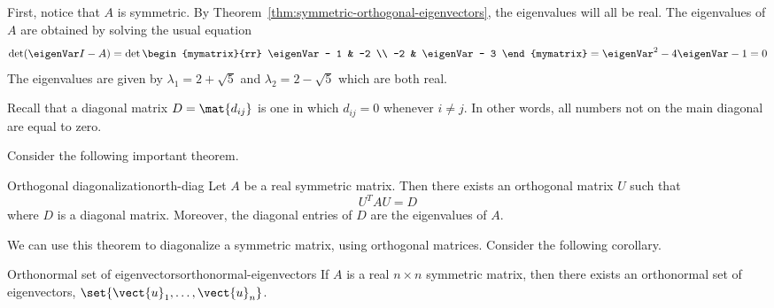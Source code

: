 \begin{solution}
First, notice that $A$ is symmetric. By Theorem~\ref{thm:symmetric-orthogonal-eigenvectors}, the eigenvalues will all be real. The eigenvalues of $A$ are obtained by solving the usual equation 
\[
\det (\eigenVar I - A) = 
\det \begin{mymatrix}{rr}
\eigenVar - 1 & -2 \\ 
-2 & \eigenVar - 3 
\end{mymatrix} = \eigenVar^2 -4\eigenVar -1=0
\]
The eigenvalues are given by $\lambda_1 =2+
\sqrt{5}$ and $\lambda_2 =2-\sqrt{5}$ which are both real. 
\end{solution}

Recall that a diagonal matrix $D=\mat{d_{ij} }$ is one in which $d_{ij} = 0$ whenever $i \neq j$. In other words, all numbers not on the main diagonal are equal to zero. 

Consider the following important theorem.

\begin{theorem}{Orthogonal diagonalization}{orth-diag}
Let $A$ be a real symmetric matrix. Then there exists an
orthogonal matrix $U$ such that 
\[
U^{T}AU = D
\]
where $D$ is a diagonal matrix. Moreover,
the diagonal entries of $D$ are the eigenvalues of $A$.
\end{theorem}

We can use this theorem to diagonalize a symmetric matrix, using orthogonal matrices. Consider the following corollary.

\begin{corollary}{Orthonormal set of eigenvectors}{orthonormal-eigenvectors}
If $A$ is a real $n\times n$ symmetric matrix, then there exists an
orthonormal set of eigenvectors, $\set{\vect{u}_{1},\ldots,\vect{u}
_{n}}$.
\end{corollary}

